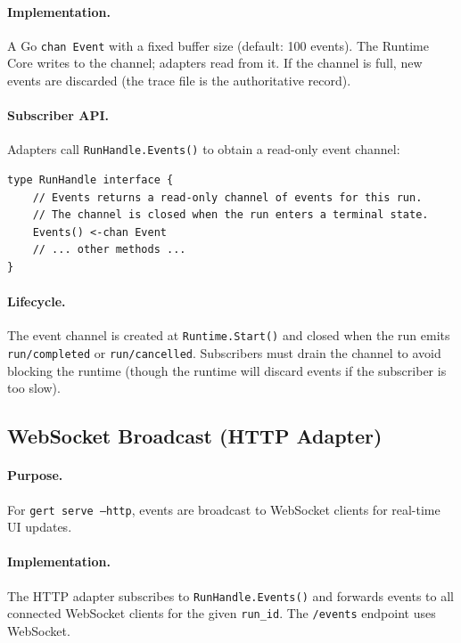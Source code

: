 \paragraph{Implementation.} A Go \texttt{chan Event} with a fixed buffer size (default: 100 events). The Runtime Core writes to the channel; adapters read from it. If the channel is full, new events are discarded (the trace file is the authoritative record).

\paragraph{Subscriber API.} Adapters call \texttt{RunHandle.Events()} to obtain a read-only event channel:

\begin{verbatim}
type RunHandle interface {
    // Events returns a read-only channel of events for this run.
    // The channel is closed when the run enters a terminal state.
    Events() <-chan Event
    // ... other methods ...
}
\end{verbatim}

\paragraph{Lifecycle.} The event channel is created at \texttt{Runtime.Start()} and closed when the run emits \texttt{run/completed} or \texttt{run/cancelled}. Subscribers must drain the channel to avoid blocking the runtime (though the runtime will discard events if the subscriber is too slow).


\subsection{WebSocket Broadcast (HTTP Adapter)}

\paragraph{Purpose.} For \texttt{gert serve --http}, events are broadcast to WebSocket clients for real-time UI updates.

\paragraph{Implementation.} The HTTP adapter subscribes to \texttt{RunHandle.Events()} and forwards events to all connected WebSocket clients for the given \texttt{run\_id}. The \texttt{/events} endpoint uses WebSocket.

